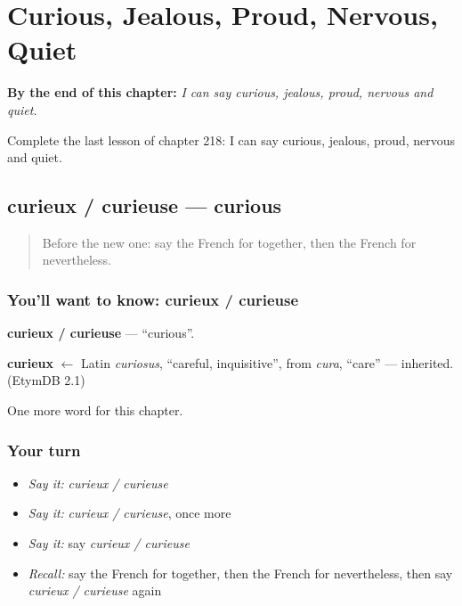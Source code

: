 
\chapter{Curious, Jealous, Proud, Nervous, Quiet}
\label{ch:fr-curious-jealous-proud-nervous-quiet}

\begin{chapteropening}
\textbf{By the end of this chapter:} \emph{I can say curious, jealous, proud, nervous and quiet.}

Complete the last lesson of chapter 218: I can say curious, jealous, proud, nervous and quiet.
\end{chapteropening}

\section[curieux / curieuse]{curieux / curieuse — curious}

\label{lesson:FR-C218-curieux-curieuse}



\begin{quote}
Before the new one: say the French for together, then the French for nevertheless.
\end{quote}

\subsection*{You'll want to know: curieux / curieuse}
\textbf{curieux / curieuse} — \textquotedblleft{}curious\textquotedblright{}.

\begin{cousinweb}
\textbf{curieux} $\leftarrow$ Latin \emph{curiosus}, \textquotedblleft{}careful, inquisitive\textquotedblright{}, from \emph{cura}, \textquotedblleft{}care\textquotedblright{} — inherited. (EtymDB 2.1)
\end{cousinweb}

\begin{grammarlens}[title={What you've built}]
One more word for this chapter.
\end{grammarlens}

\subsection*{Your turn}
\begin{itemize}
\raggedright
  \item \emph{Say it:} \emph{curieux / curieuse}
  \item \emph{Say it:} \emph{curieux / curieuse}, once more
  \item \emph{Say it:} say \emph{curieux / curieuse}
  \item \emph{Recall:} say the French for together, then the French for nevertheless, then say \emph{curieux / curieuse} again
\end{itemize}

